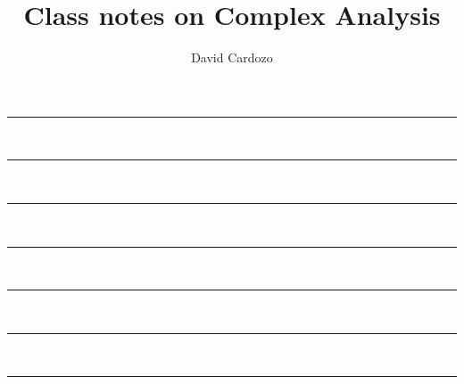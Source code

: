 \documentclass[notitlepage]{article}
\author{David Cardozo}
\title{Class notes on Complex Analysis}
\begin{document}



\noindent\rule{\textwidth}{1pt}\\[-0.1cm]


\noindent\rule{\textwidth}{1pt}\\[-0.1cm]


\noindent\rule{\textwidth}{1pt}\\[-0.1cm]
	

\noindent\rule{\textwidth}{1pt}\\[-0.1cm]



\noindent\rule{\textwidth}{1pt}\\[-0.1cm]



\noindent\rule{\textwidth}{1pt}\\[-0.1cm]


	
\noindent\rule{\textwidth}{1pt}\\[-0.1cm]


\end{document}
